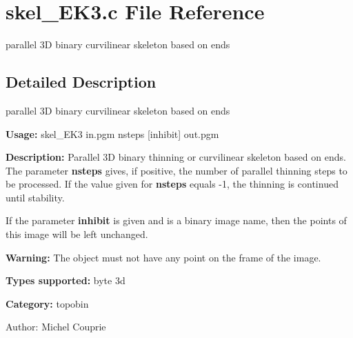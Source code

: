\section{skel\_\-EK3.c File Reference}
\label{skel__EK3_8c}
parallel 3D binary curvilinear skeleton based on ends 



\subsection{Detailed Description}
parallel 3D binary curvilinear skeleton based on ends 

{\bf Usage:} skel\_\-EK3 in.pgm nsteps [inhibit] out.pgm

{\bf Description:} Parallel 3D binary thinning or curvilinear skeleton based on ends. The parameter {\bf nsteps} gives, if positive, the number of parallel thinning steps to be processed. If the value given for {\bf nsteps} equals -1, the thinning is continued until stability.

If the parameter {\bf inhibit} is given and is a binary image name, then the points of this image will be left unchanged.

{\bf Warning:} The object must not have any point on the frame of the image.

{\bf Types supported:} byte 3d

{\bf Category:} topobin

\begin{Desc}
\item[Author:]Michel Couprie \end{Desc}
